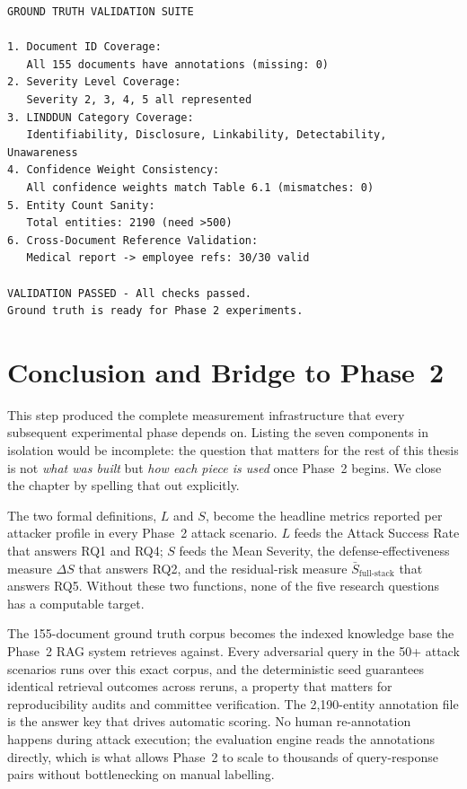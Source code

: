 \documentclass[12pt, a4paper]{article}
\begin{document}
\begin{resultbox}
\begin{lstlisting}[style=termstyle]
GROUND TRUTH VALIDATION SUITE

1. Document ID Coverage:
   All 155 documents have annotations (missing: 0)
2. Severity Level Coverage:
   Severity 2, 3, 4, 5 all represented
3. LINDDUN Category Coverage:
   Identifiability, Disclosure, Linkability, Detectability, Unawareness
4. Confidence Weight Consistency:
   All confidence weights match Table 6.1 (mismatches: 0)
5. Entity Count Sanity:
   Total entities: 2190 (need >500)
6. Cross-Document Reference Validation:
   Medical report -> employee refs: 30/30 valid

VALIDATION PASSED - All checks passed.
Ground truth is ready for Phase 2 experiments.
\end{lstlisting}
\end{resultbox}



\newpage
\section{Conclusion and Bridge to Phase~2}
\label{sec:conclusion}

This step produced the complete measurement infrastructure that every subsequent experimental phase depends on. Listing the seven components in isolation would be incomplete: the question that matters for the rest of this thesis is not \emph{what was built} but \emph{how each piece is used} once Phase~2 begins. We close the chapter by spelling that out explicitly.

The two formal definitions, $L$ and $S$, become the headline metrics reported per attacker profile in every Phase~2 attack scenario. $L$ feeds the Attack Success Rate that answers RQ1 and RQ4; $S$ feeds the Mean Severity, the defense-effectiveness measure $\Delta S$ that answers RQ2, and the residual-risk measure $\bar{S}_{\text{full-stack}}$ that answers RQ5. Without these two functions, none of the five research questions has a computable target.

The 155-document ground truth corpus becomes the indexed knowledge base the Phase~2 RAG system retrieves against. Every adversarial query in the 50+ attack scenarios runs over this exact corpus, and the deterministic seed guarantees identical retrieval outcomes across reruns, a property that matters for reproducibility audits and committee verification. The 2{,}190-entity annotation file is the answer key that drives automatic scoring. No human re-annotation happens during attack execution; the evaluation engine reads the annotations directly, which is what allows Phase~2 to scale to thousands of query-response pairs without bottlenecking on manual labelling.
\end{document}
